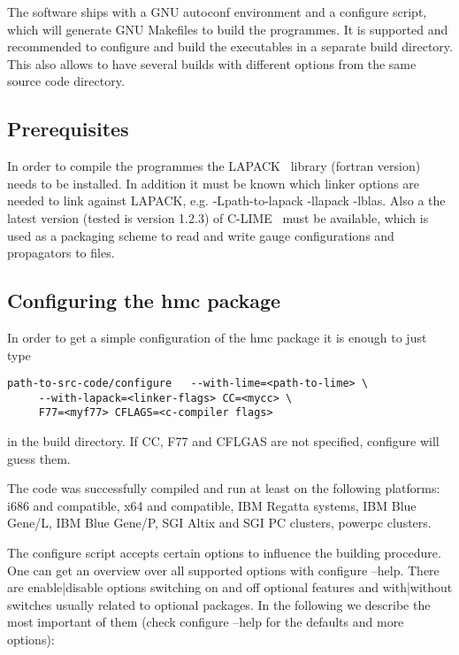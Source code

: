 The software ships with a GNU autoconf environment and a configure
script, which will generate GNU Makefiles to build the programmes. It
is supported and recommended to configure and build the executables in
a separate build directory. This also allows to have several builds with
different options from the same source code directory. 

\subsection{Prerequisites}

In order to compile the programmes the {\ttfamily
  LAPACK}~\cite{lapack:web} library (fortran version) needs to be
installed. In addition it must be known which linker options are
needed to link against {\ttfamily LAPACK}, e.g. {\ttfamily
  -Lpath-to-lapack -llapack  -lblas}. Also a the latest
version (tested is version 1.2.3) of {\ttfamily
  C-LIME}~\cite{lime:web} must be available, which is used as a
packaging scheme to read and write gauge configurations and
propagators to files.

\subsection{Configuring the hmc package}
\label{sec:config}

In order to get a simple configuration of the hmc package it is enough
to just type 
\begin{verbatim}
path-to-src-code/configure   --with-lime=<path-to-lime> \
     --with-lapack=<linker-flags> CC=<mycc> \
     F77=<myf77> CFLAGS=<c-compiler flags>
\end{verbatim}
in the build directory. If 
{\ttfamily CC, F77} and {\ttfamily CFLGAS} are not specified,
{\ttfamily configure} will guess them.

The code was successfully compiled and run at least on the following
platforms: i686 and compatible, x64 and compatible, IBM Regatta
systems, IBM Blue Gene/L, IBM Blue Gene/P, SGI Altix and SGI PC
clusters, powerpc clusters.

The configure script accepts certain options to influence the building
procedure. One can get an overview over all supported options with
{\ttfamily configure --help}. There are {\ttfamily enable|disable}
options switching on and off optional features and {\ttfamily
  with|without} switches usually related to optional packages. In the
following we describe the most important of them (check {\ttfamily
  configure --help} for the defaults and more options):

